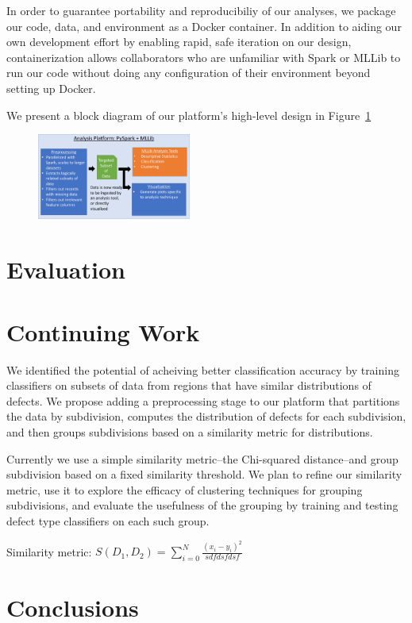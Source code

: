 \documentclass{sig-alternate-05-2015}
\begin{document}
In order to guarantee portability and reproducibiliy of our analyses, we package our code,
data, and environment as a Docker container. In addition to aiding our own development effort
by enabling rapid, safe iteration on our design, containerization allows collaborators who are
unfamiliar with Spark or MLLib to run our code without doing any configuration of their 
environment beyond setting up Docker. 



We present a block diagram of our platform's high-level design in Figure~\ref{fig_block_diagram}
\begin{figure}[ht!]
\includegraphics[width=0.45\textwidth]{block_diagram.pdf}
\label{fig_block_diagram}
\end{figure}

\section{Evaluation}

\section{Continuing Work}
We identified the potential of acheiving better classification accuracy by training 
classifiers on subsets of data from regions that have similar distributions of defects.
We propose adding a preprocessing stage to our platform that partitions the data by 
subdivision, computes the distribution of defects for each subdivision, and then groups
subdivisions based on a similarity metric for distributions. 

Currently we use a simple similarity metric--the Chi-squared distance--and group subdivision
based on a fixed similarity threshold. We plan to refine our similarity metric, use it
to explore the efficacy of clustering techniques for grouping subdivisions, and evaluate the
usefulness of the grouping by training and testing defect type classifiers on each such group. 

Similarity metric:
$S(D_1,D_2) = \sum\limits_{i=0}^{N}\frac{(x_i - y_i)^2}{sdfdsfdsf}$


\section{Conclusions}
\end{document}
